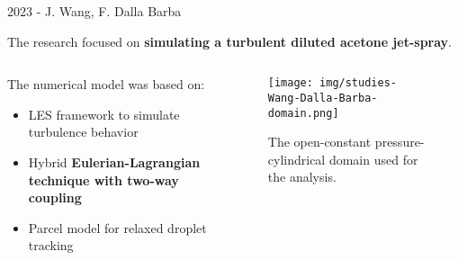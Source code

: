 \begin{frame}{2023 - J. Wang, F. Dalla Barba}

    The research focused on \textbf{simulating a turbulent diluted acetone jet-spray}.

    \begin{columns}[c, onlytextwidth]

        \begin{column}{0.5\textwidth}

            The numerical model was based on:

            \begin{itemize}
                \item LES framework to simulate turbulence behavior
                \item Hybrid \textbf{Eulerian-Lagrangian technique with two-way coupling}
                \item Parcel model for relaxed droplet tracking
            \end{itemize}

        \end{column}

        \begin{column}{0.5\textwidth}

            \begin{figure}[H]
                \centering
                \texttt{[image: img/studies-Wang-Dalla-Barba-domain.png]}
                \caption{The open-constant pressure-cylindrical domain used for the analysis.}
            \end{figure}

        \end{column}

    \end{columns}

\end{frame}